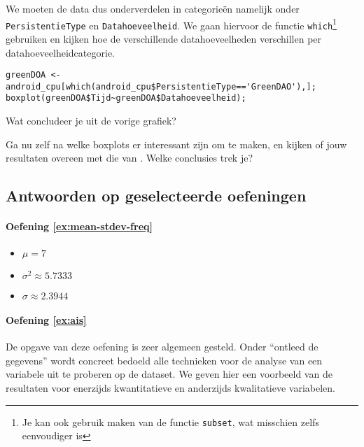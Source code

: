 We moeten de data dus onderverdelen in categorie\"en namelijk onder \texttt{PersistentieType} en \texttt{Datahoeveelheid}. We gaan hiervoor de functie \texttt{which}\footnote{Je kan ook gebruik maken van de functie \texttt{subset}, wat misschien zelfs eenvoudiger is} gebruiken en kijken hoe de verschillende datahoeveelheden verschillen per datahoeveelheidcategorie. 

\begin{lstlisting}
greenDOA <- android_cpu[which(android_cpu$PersistentieType=='GreenDAO'),];
boxplot(greenDOA$Tijd~greenDOA$Datahoeveelheid);
\end{lstlisting}

\begin{exercise}
	Wat concludeer je uit de vorige grafiek?
\end{exercise}

\begin{exercise}
	Ga nu zelf na welke boxplots er interessant zijn om te maken, en kijken of jouw resultaten overeen met die van \textcite{Akin2016}. Welke conclusies trek je?
\end{exercise}


\subsection{Antwoorden op geselecteerde oefeningen}

\paragraph{Oefening \ref{ex:mean-stdev-freq}}

\begin{itemize}
  \item $\mu = 7$
  \item $\sigma^2 \approx 5.7333$
  \item $\sigma \approx 2.3944$
\end{itemize}

\paragraph{Oefening \ref{ex:ais}}

De opgave van deze oefening is zeer algemeen gesteld. Onder ``ontleed de gegevens'' wordt concreet bedoeld alle technieken voor de analyse van een variabele uit te proberen op de dataset. We geven hier een voorbeeld van de resultaten voor enerzijds kwantitatieve en anderzijds kwalitatieve variabelen.

